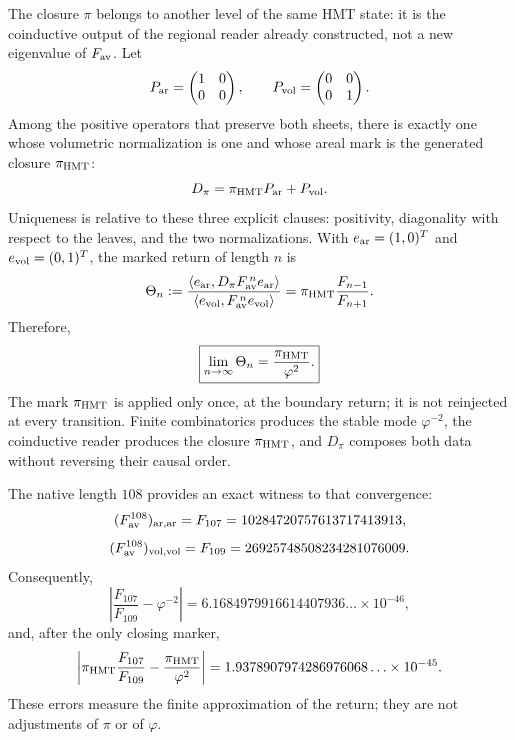 The closure \(\pi\) belongs to another level of the same HMT state: it is the
coinductive output of the regional reader already constructed, not a new eigenvalue of
\(F_{\rm av}\). Let
\[
 P_{\rm ar}=
 \begin{pmatrix}1&0\\0&0\end{pmatrix},
 \qquad
 P_{\rm vol}=
 \begin{pmatrix}0&0\\0&1\end{pmatrix}.
\]
Among the positive operators that preserve both sheets, there is exactly
one whose volumetric normalization is one and whose areal mark is the generated
closure \(\pi_{\rm HMT}\):
\[
 D_\pi=\pi_{\rm HMT}P_{\rm ar}+P_{\rm vol}.
\]
Uniqueness is relative to these three explicit clauses: positivity,
diagonality with respect to the leaves, and the two normalizations. With
\(e_{\rm ar}=(1,0)^T\) and \(e_{\rm vol}=(0,1)^T\), the marked return of
length \(n\) is
\[
 \Theta_n
 :=
 \frac{\langle e_{\rm ar},
 D_\pi F_{\rm av}^{\,n}e_{\rm ar}\rangle}
 {\langle e_{\rm vol},
 F_{\rm av}^{\,n}e_{\rm vol}\rangle}
 =
 \pi_{\rm HMT}\frac{F_{n-1}}{F_{n+1}}.
\]
Therefore,
\[
 \boxed{\displaystyle
 \lim_{n\to\infty}\Theta_n
 =\frac{\pi_{\rm HMT}}{\varphi^2}.}
\]
The mark \(\pi_{\rm HMT}\) is applied only once, at the boundary return;
it is not reinjected at every transition. Finite combinatorics produces the
stable mode \(\varphi^{-2}\), the coinductive reader produces the closure
\(\pi_{\rm HMT}\), and \(D_\pi\) composes both data without reversing their
causal order.

The native length \(108\) provides an exact witness to that convergence:
\[
 (F_{\rm av}^{108})_{\rm ar,ar}
 =F_{107}=10284720757613717413913,
\]
\[
 (F_{\rm av}^{108})_{\rm vol,vol}
 =F_{109}=26925748508234281076009.
\]
Consequently,
\[
 \left|
 \frac{F_{107}}{F_{109}}-\varphi^{-2}
 \right|
 =
 6.1684979916614407936\ldots\times10^{-46},
\]
and, after the only closing marker,
\[
 \left|
 \pi_{\rm HMT}\frac{F_{107}}{F_{109}}
 -\frac{\pi_{\rm HMT}}{\varphi^2}
 \right|
 =
 1.9378907974286976068\ldots\times10^{-45}.
\]
These errors measure the finite approximation of the return; they are not adjustments of
\(\pi\) or of \(\varphi\).

